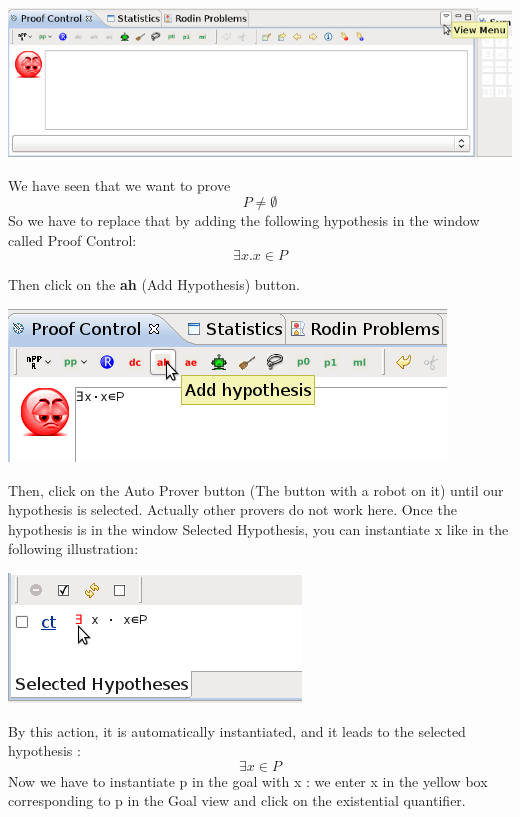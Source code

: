 \begin{center}
	\includegraphics[]{img/tutorial/tut_10_view_menu.png}
\end{center}
We have seen that we want to prove  
\[
P \neq \emptyset
\]So we have to replace that by adding the following hypothesis in the window called \textsf{Proof Control}:
\[
\exists x.x \in P 
\]

Then click on the \textbf{ah} (Add Hypothesis) button.
\begin{center}
	\includegraphics[]{img/tutorial/tut_10_hypothesis.png}
\end{center}


Then, click on the Auto Prover button (The button with a robot on it) until our hypothesis is selected. Actually other provers do not work here.
Once the hypothesis is in the window \textsf{Selected Hypothesis}, you can instantiate x like in the following illustration:

\begin{center}
	\includegraphics[]{img/tutorial/tut_10_instantiate_x.png}
\end{center}

By this action, it is automatically instantiated, and it leads to the selected hypothesis :
\[
\exists x \in P 
\]
Now we have to instantiate p in the goal with x : we enter x in the yellow box corresponding to p in the Goal view and click on the existential quantifier.

